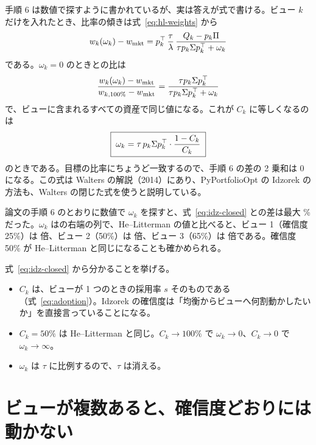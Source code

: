 手順 6 は数値で探すように書かれているが、実は答えが式で書ける。ビュー $k$ だけを入れたとき、比率の傾きは式~\eqref{eq:hl-weights} から
\begin{equation}
w_k(\omega_k)-w_{\mathrm{mkt}}=p_k^{\top}\,\frac{\tau}{\lambda}\,\frac{Q_k-p_k\Pi}{\tau p_k\Sigma p_k^{\top}+\omega_k}
\end{equation}
である。$\omega_k=0$ のときとの比は
\begin{equation}
\frac{w_k(\omega_k)-w_{\mathrm{mkt}}}{w_{k,100\%}-w_{\mathrm{mkt}}}=\frac{\tau p_k\Sigma p_k^{\top}}{\tau p_k\Sigma p_k^{\top}+\omega_k}
\end{equation}
で、ビューに含まれるすべての資産で同じ値になる。これが $C_k$ に等しくなるのは
\begin{equation}
\boxed{\;\omega_k=\tau\,p_k\Sigma p_k^{\top}\cdot\frac{1-C_k}{C_k}\;}
\label{eq:idz-closed}
\end{equation}
のときである。目標の比率にちょうど一致するので、手順 6 の差の 2 乗和は 0 になる。この式は Walters の解説（2014）にあり、PyPortfolioOpt の Idzorek の方法も、Walters の閉じた式を使うと説明している。

\begin{exbox}[数値で確かめる]
論文の手順 6 のとおりに数値で $\omega_k$ を探すと、式~\eqref{eq:idz-closed} との差は最大 \% だった。$\omega_k$ はの右端の列で、He--Litterman の値と比べると、ビュー 1（確信度 25\%）は  倍、ビュー 2（50\%）は  倍、ビュー 3（65\%）は  倍である。確信度 50\% が He--Litterman と同じになることも確かめられる。
\end{exbox}

式~\eqref{eq:idz-closed} から分かることを挙げる。

\begin{itemize}
\item $C_k$ は、ビューが 1 つのときの採用率 $s$ そのものである（式~\eqref{eq:adoption}）。Idzorek の確信度は「均衡からビューへ何割動かしたいか」を直接言っていることになる。
\item $C_k=50\%$ は He--Litterman と同じ。$C_k\to100\%$ で $\omega_k\to0$、$C_k\to0$ で $\omega_k\to\infty$。
\item $\omega_k$ は $\tau$ に比例するので、$\tau$ は消える。
\end{itemize}

\section{ビューが複数あると、確信度どおりには動かない}\label{sec:idz-multi}

